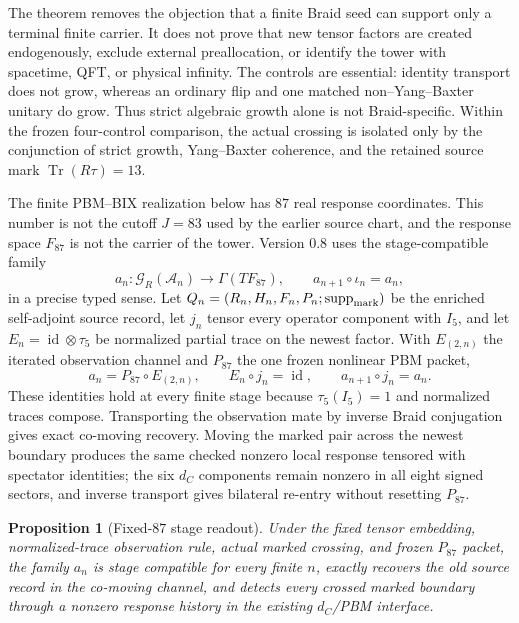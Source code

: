 \documentclass[11pt]{article}
\newtheorem{proposition}[theorem]{Proposition}
\theoremstyle{definition}
\theoremstyle{remark}
\newcommand{\cA}{\mathcal{A}}
\newcommand{\Tr}{\operatorname{Tr}}
\begin{document}
The theorem removes the objection that a finite Braid seed can support only a terminal finite carrier. It does not prove that new tensor factors are created endogenously, exclude external preallocation, or identify the tower with spacetime, QFT, or physical infinity. The controls are essential: identity transport does not grow, whereas an ordinary flip and one matched non--Yang--Baxter unitary do grow. Thus strict algebraic growth alone is not Braid-specific. Within the frozen four-control comparison, the actual crossing is isolated only by the conjunction of strict growth, Yang--Baxter coherence, and the retained source mark $\Tr(R\tau)=13$.

The finite PBM--BIX realization below has $87$ real response coordinates. This number is not the cutoff $J=83$ used by the earlier source chart, and the response space $F_{87}$ is not the carrier of the tower. Version 0.8 uses the stage-compatible family
\begin{equation}\label{eq:anchor}
 a_n:\mathcal G_R(\cA_n)\longrightarrow\Gamma(TF_{87}),
 \qquad a_{n+1}\circ\iota_n=a_n,
\end{equation}
in a precise typed sense. Let $Q_n=(R_n,H_n,F_n,P_n;\operatorname{supp}_{\rm mark})$ be the enriched self-adjoint source record, let $j_n$ tensor every operator component with $I_5$, and let $E_n=\operatorname{id}\otimes\tau_5$ be normalized partial trace on the newest factor. With $E_{(2,n)}$ the iterated observation channel and $P_{87}$ the one frozen nonlinear PBM packet,
\begin{equation}
 a_n=P_{87}\circ E_{(2,n)},
 \qquad E_n\circ j_n=\operatorname{id},
 \qquad a_{n+1}\circ j_n=a_n.
\end{equation}
These identities hold at every finite stage because $\tau_5(I_5)=1$ and normalized traces compose. Transporting the observation mate by inverse Braid conjugation gives exact co-moving recovery. Moving the marked pair across the newest boundary produces the same checked nonzero local response tensored with spectator identities; the six $d_C$ components remain nonzero in all eight signed sectors, and inverse transport gives bilateral re-entry without resetting $P_{87}$.

\begin{proposition}[Fixed-$87$ stage readout]\label{prop:stage87}
Under the fixed tensor embedding, normalized-trace observation rule, actual marked crossing, and frozen $P_{87}$ packet, the family $a_n$ is stage compatible for every finite $n$, exactly recovers the old source record in the co-moving channel, and detects every crossed marked boundary through a nonzero response history in the existing $d_C$/PBM interface.
\end{proposition}
\end{document}
